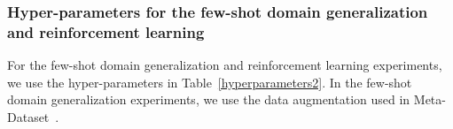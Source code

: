 \subsubsection{Hyper-parameters for the few-shot domain generalization and reinforcement learning}
For the few-shot domain generalization and reinforcement learning experiments, we use the hyper-parameters in Table~\ref{hyperparameters2}. In the few-shot domain generalization experiments, we use the data augmentation used in Meta-Dataset~\cite{triantafillou2019meta}.
\begin{table}[h!]
  \caption{Hyper-parameters used for training GAP on the few-shot domain generalization and reinforcement learning experiments.}
  \centering
  \label{hyperparameters2}
\end{table}


